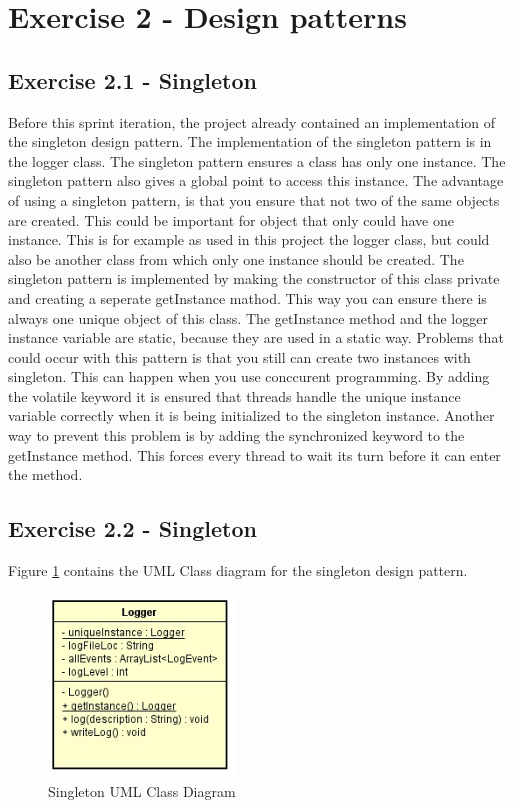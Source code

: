 \section{Exercise 2 - Design patterns }
\subsection{Exercise 2.1 - Singleton}
Before this sprint iteration, the project already contained an implementation of the singleton design pattern. The implementation of the singleton pattern is in the logger class. The singleton pattern ensures a class has only one instance. The singleton pattern also gives a global point to access this instance. The advantage of using a singleton pattern, is that you ensure that not two of the same objects are created. This could be important for object that only could have one instance. This is for example as used in this project the logger class, but could also be another class from which only one instance should be created.  The singleton pattern is implemented by making the constructor of this class private and creating a seperate getInstance mathod. This way you can ensure there is always one unique object of this class. The getInstance method and the logger instance variable are static, because they are used in a static way. Problems that could occur with this pattern is that you still can create two instances with singleton. This can happen when you use conccurent programming. By adding the volatile keyword it is ensured that threads handle the unique instance variable correctly when it is being initialized to the singleton instance.
Another way to prevent this problem is by adding the synchronized keyword to the getInstance method. This forces every thread to wait its turn before it can enter the method.
\subsection{Exercise 2.2 - Singleton}
Figure \ref{fig:2-2singleton} contains the UML Class diagram for the singleton design pattern.
\begin{figure}[ht!]
\centering
\includegraphics[width=5cm]{logger.jpg}
\caption{Singleton UML Class Diagram}
\label{fig:2-2singleton}
\end{figure}
\newpage

